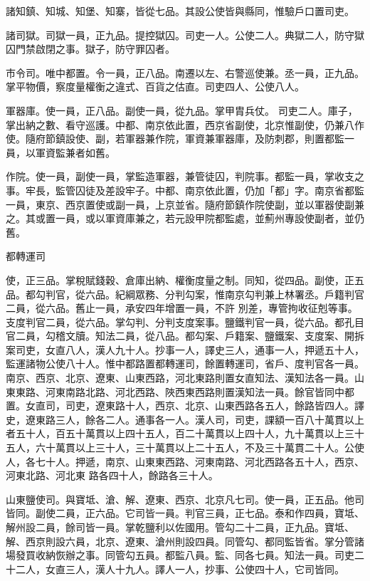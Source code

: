 \begin{pinyinscope}
 諸知鎮、知城、知堡、知寨，皆從七品。其設公使皆與縣同，惟驗戶口置司吏。



 諸司獄。司獄一員，正九品。提控獄囚。司吏一人。公使二人。典獄二人，防守獄囚門禁啟閉之事。獄子，防守罪囚者。



 市令司。唯中都置。令一員，正八品。南遷以左、右警巡使兼。丞一員，正九品。掌平物價，察度量權衡之違式、百貨之估直。司吏四人、公使八人。



 軍器庫。使一員，正八品。副使一員，從九品。掌甲胄兵仗。
 司吏二人。庫子，掌出納之數、看守巡護。中都、南京依此置，西京省副使，北京惟副使，仍兼八作使。隨府節鎮設使、副，若軍器兼作院，軍資兼軍器庫，及防刺郡，則置都監一員，以軍資監兼者如舊。



 作院。使一員，副使一員，掌監造軍器，兼管徒囚，判院事。都監一員，掌收支之事。牢長，監管囚徒及差設牢子。中都、南京依此置，仍加「都」字。南京省都監一員，東京、西京置使或副一員，上京並省。隨府節鎮作院使副，並以軍器使副兼之。其或置一員，或以軍資庫兼之，若元設甲院都監處，並薊州專設使副者，並仍舊。



 都轉運司



 使，正三品。掌稅賦錢穀、倉庫出納、權衡度量之制。同知，從四品。副使，正五品。都勾判官，從六品。紀綱眾務、分判勾案，惟南京勾判兼上林署丞。戶籍判官二員，從六品。舊止一員，承安四年增置一員，不許
 別差，專管拘收征剋等事。支度判官二員，從六品。掌勾判、分判支度案事。鹽鐵判官一員，從六品。都孔目官二員，勾稽文牘。知法二員，從八品。都勾案、戶籍案、鹽鐵案、支度案、開拆案司吏，女直八人，漢人九十人。抄事一人，譯史三人，通事一人，押遞五十人，監運諸物公使八十人。惟中都路置都轉運司，餘置轉運司，省戶、度判官各一員。南京、西京、北京、遼東、山東西路，河北東路則置女直知法、漢知法各一員。山東東路、河東南路北路、河北西路、陜西東西路則置漢知法一員。餘官皆同中都置。女直司，司吏，遼東路十人，西京、北京、山東西路各五人，餘路皆四人。譯史，遼東路三人，餘各二人。通事各一人。漢人司，司吏，課額一百八十萬貫以上者五十人，百五十萬貫以上四十五人，百二十萬貫以上四十人，九十萬貫以上三十五人，六十萬貫以上三十人，三十萬貫以上二十五人，不及三十萬貫二十人。公使人，各七十人。押遞，南京、山東東西路、河東南路、河北西路各五十人，西京、河東北路、河北東
 路各四十人，餘路各三十人。



 山東鹽使司。與寶坻、滄、解、遼東、西京、北京凡七司。使一員，正五品。他司皆同。副使二員，正六品。它司皆一員。判官三員，正七品。泰和作四員，寶坻、解州設二員，餘司皆一員。掌乾鹽利以佐國用。管勾二十二員，正九品。寶坻、解、西京則設六員，北京、遼東、滄州則設四員。同管勾、都同監皆省。掌分管諸場發買收納恢辦之事。同管勾五員。都監八員。監、同各七員。知法一員。司吏二十二人，女直三人，漢人十九人。譯人一人，抄事、公使四十人，它司皆同。




\end{pinyinscope}
